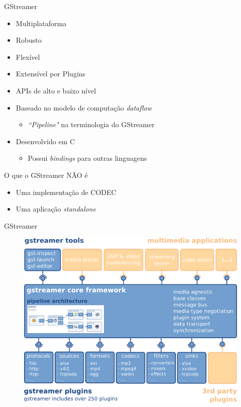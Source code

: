 \documentclass{beamer}
\def\en#1{\foreignlanguage{english}{\emph{#1}}}
\begin{document}
\begin{frame}[c]{GStreamer}
  \begin{itemize}
    \item Multiplataforma
    \item Robusto
    \item Flexível
    \item Extensível por Plugins
    \item APIs de alto e baixo nível
    \item Baseado no modelo de computação \en{dataflow}
      \begin{itemize}
        \item \en{``Pipeline"} na terminologia do GStreamer
      \end{itemize}
    \item Desenvolvido em C
      \begin{itemize}
        \item Possui \en{bindings} para outras linguagens
      \end{itemize}
  \end{itemize}

  \begin{block}{O que o GStreamer NÃO é}
    \begin{itemize}
      \item Uma implementação de CODEC
      \item Uma aplicação \en{standalone}
    \end{itemize}
  \end{block}
\end{frame}

\begin{frame}[c]{GStreamer}
  \begin{figure}
    \centering
    \includegraphics[scale=0.5]{figs/gstreamer-overview}
  \end{figure}
\end{frame}
\end{document}
